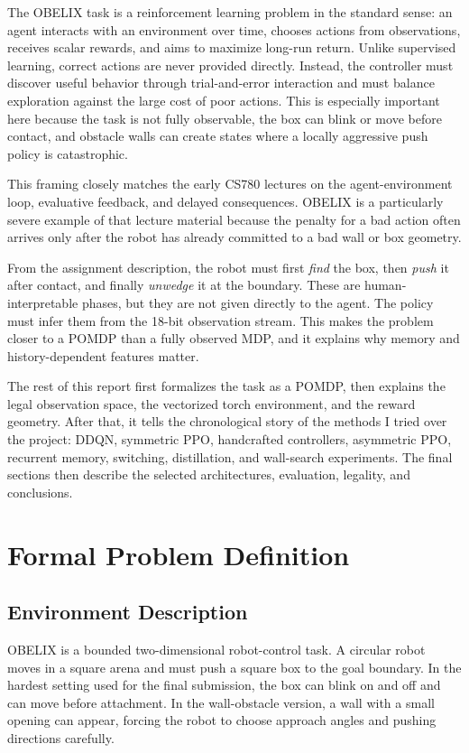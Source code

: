 \documentclass[11pt, oneside]{article}   	%
\begin{document}
The OBELIX task is a reinforcement learning problem in the standard sense: an agent
interacts with an environment over time, chooses actions from observations, receives
scalar rewards, and aims to maximize long-run return. Unlike supervised learning,
correct actions are never provided directly. Instead, the controller must discover useful
behavior through trial-and-error interaction and must balance exploration against the
large cost of poor actions. This is especially important here because the task is not fully
observable, the box can blink or move before contact, and obstacle walls can create
states where a locally aggressive push policy is catastrophic.

This framing closely matches the early CS780 lectures on the agent-environment loop,
evaluative feedback, and delayed consequences. OBELIX is a particularly severe example
of that lecture material because the penalty for a bad action often arrives only after the
robot has already committed to a bad wall or box geometry.

From the assignment description, the robot must first \emph{find} the box, then
\emph{push} it after contact, and finally \emph{unwedge} it at the boundary. These are
human-interpretable phases, but they are not given directly to the agent. The policy
must infer them from the 18-bit observation stream. This makes the problem closer to a
POMDP than a fully observed MDP, and it explains why memory and history-dependent
features matter.

The rest of this report first formalizes the task as a POMDP, then explains the legal
observation space, the vectorized torch environment, and the reward geometry. After
that, it tells the chronological story of the methods I tried over the project: DDQN,
symmetric PPO, handcrafted controllers, asymmetric PPO, recurrent memory, switching,
distillation, and wall-search experiments. The final sections then describe the selected
architectures, evaluation, legality, and conclusions.

\section{Formal Problem Definition}

\subsection{Environment Description}

OBELIX is a bounded two-dimensional robot-control task. A circular robot moves in a
square arena and must push a square box to the goal boundary. In the hardest setting
used for the final submission, the box can blink on and off and can move before
attachment. In the wall-obstacle version, a wall with a small opening can appear,
forcing the robot to choose approach angles and pushing directions carefully.
\end{document}
